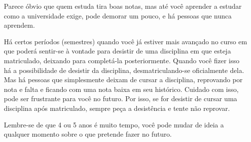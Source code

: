 Parece óbvio que quem estuda tira boas notas, mas até você aprender a estudar como
a universidade exige, pode demorar um pouco, e há pessoas que nunca aprendem.

Há certos períodos (semestres) quando você já estiver mais avançado no curso em
que poderá sentir-se à vontade para desistir de uma disciplina em que esteja
matriculado, deixando para completá-la posteriormente. Quando você fizer isso há
a possibilidade de desistir da disciplina, desmatriculando-se oficialmente dela.
Mas há pessoas que simplesmente deixam de cursar a disciplina, reprovando por
nota e falta e ficando com uma nota baixa em seu histórico. Cuidado com isso,
pode ser frustrante para você no futuro. Por isso, se for desistir de cursar uma
disciplina após matriculado, sempre peça a desistência e tente não reprovar.

Lembre-se de que 4 ou 5 anos é muito tempo, você pode mudar de ideia a qualquer
momento sobre o que pretende fazer no futuro.
